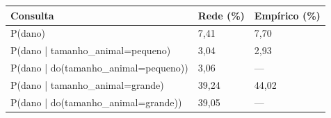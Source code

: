 \begin{tabular}{lll}
\toprule
Consulta & Rede (\%) & Empírico (\%) \\
\midrule
P(dano) & 7,41 & 7,70 \\
P(dano | tamanho\_animal=pequeno) & 3,04 & 2,93 \\
P(dano | do(tamanho\_animal=pequeno)) & 3,06 & — \\
P(dano | tamanho\_animal=grande) & 39,24 & 44,02 \\
P(dano | do(tamanho\_animal=grande)) & 39,05 & — \\
\bottomrule
\end{tabular}
